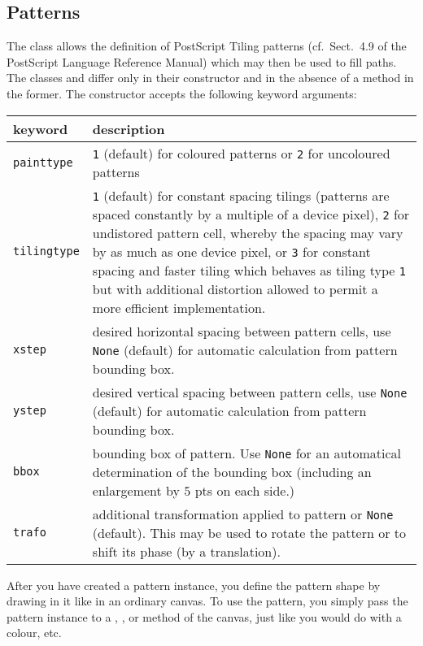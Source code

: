 \subsection{Patterns}

The  class allows the definition of PostScript Tiling
patterns (cf.\ Sect.~4.9 of the PostScript Language Reference Manual)
which may then be used to fill paths. The classes  and
 differ only in their constructor and in the absence of
a  method in the former. The 
constructor accepts the following keyword arguments:

\medskip
\begin{tabularx}{\linewidth}{l>{\raggedright\arraybackslash}X}
keyword&description\\
\hline
\texttt{painttype}&\texttt{1} (default) for coloured patterns or
\texttt{2} for uncoloured patterns\\
\texttt{tilingtype}&\texttt{1} (default) for constant spacing tilings
(patterns are spaced constantly by a multiple of a device pixel),
\texttt{2} for undistored pattern cell, whereby the spacing may vary
by as much as one device pixel, or \texttt{3} for constant spacing and
faster tiling which behaves as tiling type \texttt{1} but with
additional distortion allowed to permit a more efficient
implementation.\\
\texttt{xstep}&desired horizontal spacing between pattern cells, use
\texttt{None} (default) for automatic calculation from pattern
bounding box.\\
\texttt{ystep}&desired vertical spacing between pattern cells, use
\texttt{None} (default) for automatic calculation from pattern
bounding box.\\
\texttt{bbox}&bounding box of pattern. Use \texttt{None} for an
automatical determination of the bounding box (including an
enlargement by $5$ pts on each side.)\\
\texttt{trafo}&additional transformation applied to pattern or
\texttt{None} (default). This may be used to rotate the pattern or to
shift its phase (by a translation).
\end{tabularx}
\medskip

After you have created a pattern instance, you define the pattern
shape by drawing in it like in an ordinary canvas. To use the pattern,
you simply pass the pattern instance to a ,
,  or  method of the
canvas, just like you would do with a colour, etc.



